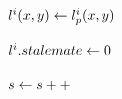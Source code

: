\begin{algorithm}[tb!]
\begin{algorithmic}[1]
                            \If{$ \nodeListEachStalemate < \stalemateMax $}

                                \State $ l^i(x,y) \gets l^i_{p}(x,y) $

                            \Else

                                \State {}
                                \State $ l^i.stalemate \gets 0 $

                            \EndIf
                            
                        \EndIf

                    \EndIf

                \EndFor

            \EndWhile

            \State $ s \gets s ++$

        \EndWhile

        \EndProcedure
    \end{algorithmic}
\end{algorithm}









